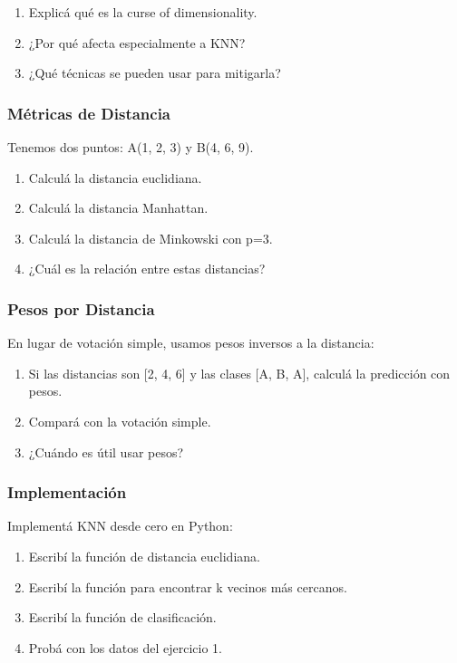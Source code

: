 \documentclass[12pt]{article}
\begin{document}
\begin{enumerate}
    \item Explicá qué es la curse of dimensionality.
    \item ¿Por qué afecta especialmente a KNN?
    \item ¿Qué técnicas se pueden usar para mitigarla?
\end{enumerate}

\subsubsection{Métricas de Distancia}

Tenemos dos puntos: A(1, 2, 3) y B(4, 6, 9).

\begin{enumerate}
    \item Calculá la distancia euclidiana.
    \item Calculá la distancia Manhattan.
    \item Calculá la distancia de Minkowski con p=3.
    \item ¿Cuál es la relación entre estas distancias?
\end{enumerate}

\subsubsection{Pesos por Distancia}

En lugar de votación simple, usamos pesos inversos a la distancia:

\begin{enumerate}
    \item Si las distancias son [2, 4, 6] y las clases [A, B, A], calculá la predicción con pesos.
    \item Compará con la votación simple.
    \item ¿Cuándo es útil usar pesos?
\end{enumerate}

\subsubsection{Implementación}

Implementá KNN desde cero en Python:

\begin{enumerate}
    \item Escribí la función de distancia euclidiana.
    \item Escribí la función para encontrar k vecinos más cercanos.
    \item Escribí la función de clasificación.
    \item Probá con los datos del ejercicio 1.
\end{enumerate}
\end{document}
